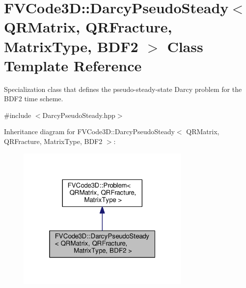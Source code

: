 \hypertarget{classFVCode3D_1_1DarcyPseudoSteady_3_01QRMatrix_00_01QRFracture_00_01MatrixType_00_01BDF2_01_4}{}\section{F\+V\+Code3D\+:\+:Darcy\+Pseudo\+Steady$<$ Q\+R\+Matrix, Q\+R\+Fracture, Matrix\+Type, B\+D\+F2 $>$ Class Template Reference}
\label{classFVCode3D_1_1DarcyPseudoSteady_3_01QRMatrix_00_01QRFracture_00_01MatrixType_00_01BDF2_01_4}


Specialization class that defines the pseudo-\/steady-\/state Darcy problem for the B\+D\+F2 time scheme.  




{\ttfamily \#include $<$Darcy\+Pseudo\+Steady.\+hpp$>$}



Inheritance diagram for F\+V\+Code3D\+:\+:Darcy\+Pseudo\+Steady$<$ Q\+R\+Matrix, Q\+R\+Fracture, Matrix\+Type, B\+D\+F2 $>$\+:
\nopagebreak
\begin{figure}[H]
\begin{center}
\leavevmode
\includegraphics[width=241pt]{classFVCode3D_1_1DarcyPseudoSteady_3_01QRMatrix_00_01QRFracture_00_01MatrixType_00_01BDF2_01_4__inherit__graph}
\end{center}
\end{figure}


